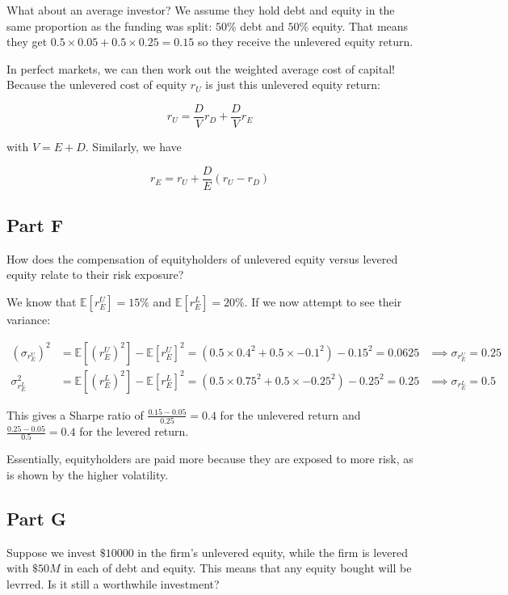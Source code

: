 \documentclass[12pt, letterpaper, parskip = full]{article}
\newcommand{\Ex}[1]{\mathbb{E}\left[#1\right]}
\begin{document}
    What about an average investor? We assume they hold debt and equity in the same proportion as the funding was split: \(50\%\) debt and \(50\%\) equity. That means they get \(0.5 \times 0.05 + 0.5 \times 0.25 = 0.15\) so they receive the unlevered equity return.

    In perfect markets, we can then work out the weighted average cost of capital! Because the unlevered cost of equity \(r_U\) is just this unlevered equity return:

    \[ r_U = \frac{D}{V} r_D + \frac{D}{V} r_E   \]
    
    with \(V = E + D\). Similarly, we have

    \[ r_E = r_U + \frac{D}{E} (r_U - r_D)   \]

    \subsection{Part F}

    How does the compensation of equityholders of unlevered equity versus levered equity relate to their risk exposure?

    We know that \(\Ex{r_E^U} = 15\%\) and \(\Ex{r_E^L} = 20\%\). If we now attempt to see their variance:

    \begin{align*}
    (\sigma_{r_E^U})^2 &= \Ex{(r_E^U)^2} - \Ex{r_E^U}^2 = \left(0.5 \times 0.4^2 + 0.5 \times -0.1^2\right) - 0.15^2 = 0.0625 &\implies \sigma_{r_E^U} = 0.25 \\
    \sigma_{r_E^L}^2 &= \Ex{(r_E^L)^2} - \Ex{r_E^L}^2 = \left( 0.5 \times 0.75^2 + 0.5 \times -0.25^2 \right) - 0.25^2 = 0.25 &\implies \sigma_{r_E^L} = 0.5
    \end{align*}

    This gives a Sharpe ratio of \(\frac{0.15 - 0.05}{0.25} = 0.4\) for the unlevered return and \(\frac{0.25 - 0.05}{0.5} = 0.4\) for the levered return.

    Essentially, equityholders are paid more because they are exposed to more risk, as is shown by the higher volatility.

    \subsection{Part G}

    Suppose we invest \(\$10000\) in the firm's unlevered equity, while the firm is levered with \(\$50M\) in each of debt and equity. This means that any equity bought will be levrred. Is it still a worthwhile investment?
\end{document}
